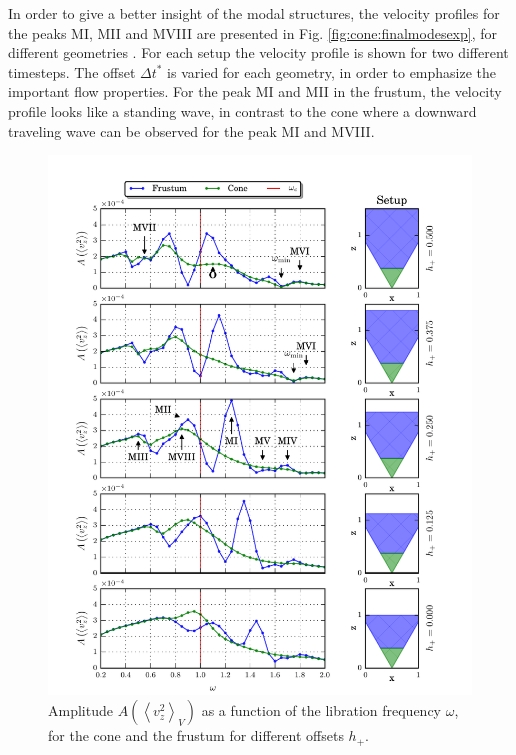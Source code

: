In order to give a better insight of the modal structures, the velocity profiles for the peaks M\RN{1}, M\RN{2} and M\RN{8}
are presented in Fig. \ref{fig:cone:finalmodesexp}, for different geometries .
For each setup the velocity profile is shown for two different timesteps. The offset $\Delta t^*$ is varied  for each geometry, in order to emphasize
the important flow properties.
For the peak M\RN{1} and M\RN{2} in the frustum, the velocity profile looks like a standing wave,
in contrast to the cone where a downward traveling wave can be observed for the peak M\RN{1} and M\RN{8}.


\begin{figure}[!pt]
  \centering
  \includegraphics{gfx/cone/final/transition.pdf}
  \caption{
      \label{fig:cone:finaltransition}Amplitude $A\left(\left<v^2_z\right>_V\right)$ as a function of the libration frequency $\omega$,
      for the cone  and the frustum for different offsets $h_+$.
    }
\end{figure}
\clearpage


